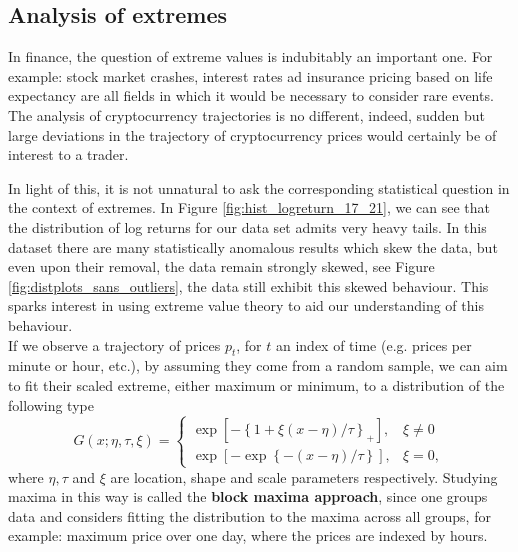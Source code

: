 \documentclass[twoside]{report}
\begin{document}
\begin{spacing}{1}
\subsection{Analysis of extremes}

In finance, the question of extreme values is indubitably an important one. For example: stock market crashes, interest rates ad  insurance pricing based on life expectancy are all fields in which it would be necessary to consider rare events. The analysis of cryptocurrency trajectories is no different, indeed, sudden but large deviations in the trajectory of cryptocurrency prices would certainly be of interest to a trader. 

In light of this, it is not unnatural to ask the corresponding statistical question in the context of extremes. In Figure \ref{fig:hist_logreturn_17_21}, we can see that the distribution of log returns for our data set admits very heavy tails. In this dataset there are many statistically anomalous results which skew the data, but even upon their removal, the data remain strongly skewed, see Figure \ref{fig:distplots_sans_outliers}, the data still exhibit this skewed behaviour. This sparks interest in using extreme value theory to aid our understanding of this behaviour.\\

If we observe a trajectory of prices $p_t$, for $t$ an index of time (e.g. prices per minute or hour, etc.), by assuming they come from a random sample, we can aim to fit their scaled extreme, either maximum or minimum, to a distribution of the following type \[
G(x; \eta, \tau, \xi) = \begin{cases}
\exp\left[-\left\{1+\xi(x-\eta)/\tau\right\}_+\right], & \xi \ne 0\\
\exp\left[-\exp\left\{-(x-\eta)/\tau\right\}\right], & \xi = 0,
\end{cases}
\]
where $\eta, \tau$ and $\xi$ are location, shape and scale parameters respectively. Studying maxima in this way is called the \textbf{block maxima approach}, since one groups data and considers fitting the distribution to the maxima across all groups, for example: maximum price over one day, where the prices are indexed by hours.


\end{spacing}
\end{document}
